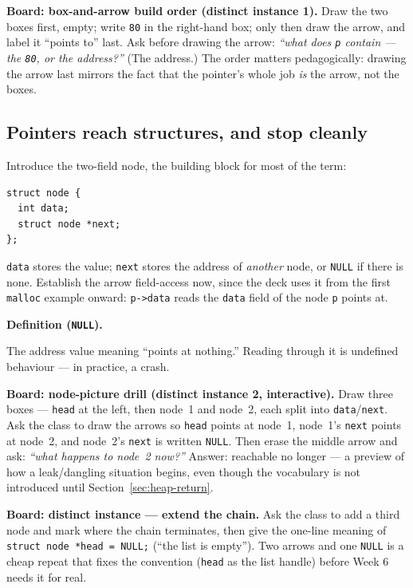 \documentclass[11pt]{article}
\newenvironment{definitionbox}[1]{%
  \par\noindent\textbf{Definition (#1).}\ \itshape
}{\par\vspace{0.3em}}
\begin{document}
\textbf{Board: box-and-arrow build order (distinct instance 1).} Draw the two boxes first, empty; write \texttt{80} in the right-hand box; only then draw the arrow, and label it ``points to'' last. Ask before drawing the arrow: \emph{``what does \texttt{p} contain --- the \texttt{80}, or the address?''} (The address.) The order matters pedagogically: drawing the arrow last mirrors the fact that the pointer's whole job \emph{is} the arrow, not the boxes.

\subsection{Pointers reach structures, and stop cleanly}

Introduce the two-field node, the building block for most of the term:
\begin{verbatim}
struct node {
  int data;
  struct node *next;
};
\end{verbatim}
\texttt{data} stores the value; \texttt{next} stores the address of \emph{another} node, or \texttt{NULL} if there is none. Establish the arrow field-access now, since the deck uses it from the first \texttt{malloc} example onward: \texttt{p->data} reads the \texttt{data} field of the node \texttt{p} points at.

\begin{definitionbox}{\texttt{NULL}}
The address value meaning ``points at nothing.'' Reading through it is undefined behaviour --- in practice, a crash.
\end{definitionbox}

\textbf{Board: node-picture drill (distinct instance 2, interactive).} Draw three boxes --- \texttt{head} at the left, then node~1 and node~2, each split into \texttt{data}/\texttt{next}. Ask the class to draw the arrows so \texttt{head} points at node~1, node~1's \texttt{next} points at node~2, and node~2's \texttt{next} is written \texttt{NULL}. Then erase the middle arrow and ask: \emph{``what happens to node~2 now?''} Answer: reachable no longer --- a preview of how a leak/dangling situation begins, even though the vocabulary is not introduced until Section~\ref{sec:heap-return}.

\textbf{Board: distinct instance --- extend the chain.} Ask the class to add a third node and mark where the chain terminates, then give the one-line meaning of \texttt{struct node *head = NULL;} (``the list is empty''). Two arrows and one \texttt{NULL} is a cheap repeat that fixes the convention (\texttt{head} as the list handle) before Week 6 needs it for real.
\end{document}
